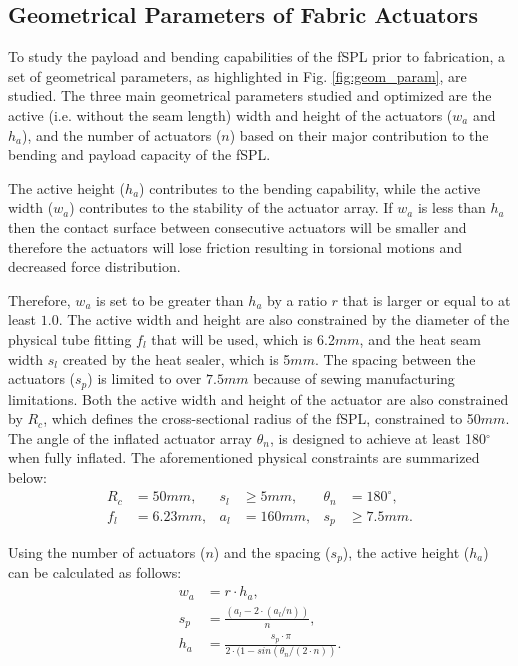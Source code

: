 \documentclass[letterpaper, 10 pt, conference]{ieeeconf}  %
\begin{document}
\subsection{Geometrical Parameters of Fabric Actuators }
% 
To study the payload and bending capabilities of the fSPL prior to fabrication, a set of geometrical parameters, as highlighted in Fig. \ref{fig:geom_param}, are studied. The three main geometrical parameters studied and optimized are the active (i.e. without the seam length) width and height of the actuators ($w_{a}$ and $h_{a}$), and the number of actuators ($n$) based on their major contribution to the bending and payload capacity of the fSPL.

The active height ($h_{a}$) contributes to the bending capability, while the active width ($w_{a}$) contributes to the stability of the actuator array. If $w_{a}$ is less than $h_{a}$ then the contact surface between consecutive actuators will be smaller and therefore the actuators will lose friction resulting in torsional motions and decreased force distribution.

Therefore, $w_a$ is set to be greater than $h_a$ by a ratio $r$ that is larger or equal to at least $1.0$. The active width and height are also constrained by the diameter of the physical tube fitting $f_l$ that will be used, which is 6.2$mm$, and the heat seam width $s_l$ created by the heat sealer, which is 5$mm$. The spacing between the actuators ($s_{p}$) is limited to over $7.5mm$ because of sewing manufacturing limitations. Both the active width and height of the actuator are also constrained by $R_{c}$, which defines the cross-sectional radius of the fSPL, constrained to 50$mm$. The angle of the inflated  actuator array  $\theta_{n}$, is designed to achieve at least 180$^{\circ}$ when fully inflated. The aforementioned  physical constraints are summarized below:
\begin{align*}
R_c &= 50mm,    &  s_l &\geq 5mm,      &  \theta_n&=180^\circ,\\
f_l&=6.23mm,         &  a_l&=160mm,   &  s_p&\geq7.5mm.
\label{eq:constraints}
\end{align*}

Using the number of actuators ($n$) and the spacing ($s_{p}$), the active height ($h_{a}$) can be calculated as follows:
% 
\begin{align} 
w_a &= r\cdot h_a, \\
s_p &=  \frac{(a_{l} - 2\cdot(a_l/n))}{n}, \\ 
h_a &=  \frac{s_p \cdot \pi}{2\cdot(1-sin(\theta_n/(2\cdot n))} \label{eq:wa_sp_ha}.
\end{align}
\end{document}
